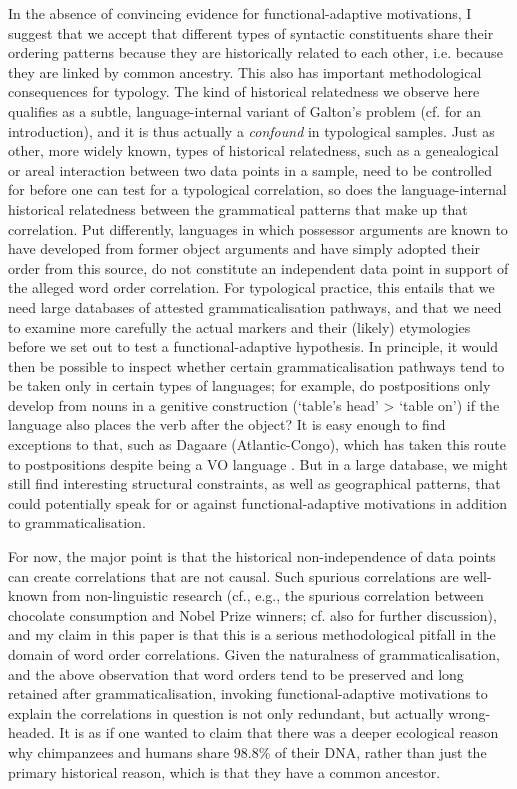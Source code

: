 \documentclass[output=paper]{langsci/langscibook}
\begin{document}
In the absence of convincing evidence for functional-adaptive motivations, I suggest that we accept that different types of syntactic constituents share their ordering patterns because they are historically related to each other, i.e. because they are linked by common ancestry. This also has important methodological consequences for typology. The 
\label{p:collins:dependency}
kind of historical relatedness we observe here qualifies as a subtle, language-internal variant of Galton’s problem (cf. \citealt{Cysouw2011} for an introduction), and it is thus actually a \textit{confound} in typological samples. Just as other, more widely known, types of historical relatedness, such as a genealogical or areal interaction between two data points in a sample, need to be controlled for before one can test for a typological correlation, so does the language-internal historical relatedness between the grammatical patterns that make up that correlation. Put differently, languages in which possessor arguments are known to have developed from former object arguments and have simply adopted their order from this source, do not constitute an independent data point in support of the alleged word order correlation. For typological practice, this entails that we need large databases
\label{pg:collins:refforhaspelmath}
of attested grammaticalisation pathways, and that we need to examine more carefully the actual markers and their (likely) etymologies before we set out to test a functional-adaptive hypothesis. In principle, it would then be possible to inspect whether certain grammaticalisation pathways tend to be taken only in certain types of languages; for example, do postpositions only develop from nouns in a genitive construction (‘table's head’ > ‘table on’) if the language also places the verb after the object? It is easy enough to find exceptions to that, such as Dagaare (Atlantic-Congo), which has taken this route to postpositions despite being a VO language \citep{Bodomo1997}. But in a large database, we might still find interesting structural constraints, as well as geographical patterns, that could potentially speak for or against functional-adaptive motivations in addition to grammaticalisation. 

For now, the major point is that the historical non-independence of data points can create correlations that are not causal. Such spurious correlations are well-known from non-linguistic research (cf., e.g., the spurious correlation between chocolate consumption and Nobel Prize winners; cf. also \citealt{RobertsWinters2013} for further discussion), and my claim in this paper is that this is a serious methodological pitfall in the domain of word order correlations. Given the naturalness of grammaticalisation, and the above observation that word orders tend to be preserved and long retained after grammaticalisation, invoking functional-adaptive motivations to explain the correlations in question is not only redundant, but actually wrong-headed. It is as if one wanted to claim that there was a deeper ecological reason why chimpanzees and humans share 98.8\% of their DNA, rather than just the primary historical reason, which is that they have a common ancestor.
\end{document}
